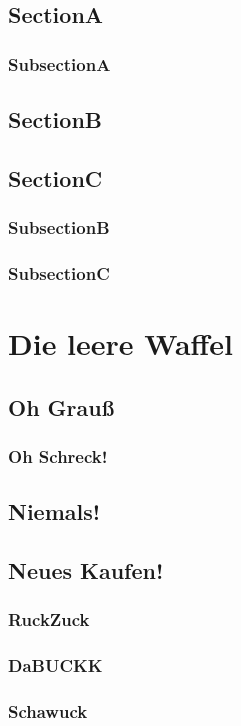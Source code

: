 \documentclass[ElegantBook]{Lilly}
\begin{document}
\section{SectionA}
\subsection{SubsectionA}
\section{SectionB}
\section{SectionC}
\subsection{SubsectionB}
\subsection{SubsectionC}

\chapter{Die leere Waffel}
\printMiniToc
\section{Oh Grauß}
\subsection{Oh Schreck!}
\section{Niemals!}
\section{Neues Kaufen!}
\subsection{RuckZuck}
\subsection{DaBUCKK}
\subsection{Schawuck}
\end{document}
